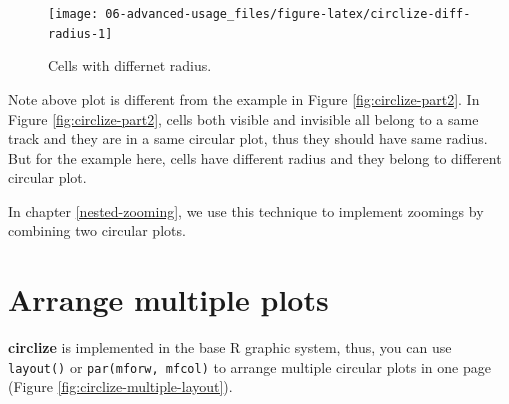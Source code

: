 \documentclass[]{book}
\theoremstyle{definition}
\theoremstyle{definition}
\theoremstyle{remark}
\begin{document}
\begin{figure}

{\centering \texttt{[image: 06-advanced-usage\_files/figure-latex/circlize-diff-radius-1]} 

}

\caption{Cells with differnet radius.}\label{fig:circlize-diff-radius}
\end{figure}

Note above plot is different from the example in Figure
\ref{fig:circlize-part2}. In Figure \ref{fig:circlize-part2}, cells both
visible and invisible all belong to a same track and they are in a same
circular plot, thus they should have same radius. But for the example
here, cells have different radius and they belong to different circular
plot.

In chapter \ref{nested-zooming}, we use this technique to implement
zoomings by combining two circular plots.

\section{Arrange multiple plots}\label{arrange-multiple-plots}

\textbf{circlize} is implemented in the base R graphic system, thus, you
can use \texttt{layout()} or \texttt{par(mforw,\ mfcol)} to arrange
multiple circular plots in one page (Figure
\ref{fig:circlize-multiple-layout}).
\end{document}
